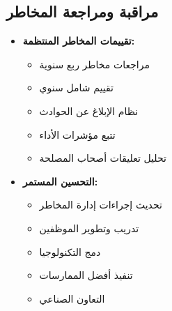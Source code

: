 \subsection{مراقبة ومراجعة المخاطر}
\begin{itemize}
    \item \textbf{تقييمات المخاطر المنتظمة:}
    \begin{itemize}
        \item مراجعات مخاطر ربع سنوية
        \item تقييم شامل سنوي
        \item نظام الإبلاغ عن الحوادث
        \item تتبع مؤشرات الأداء
        \item تحليل تعليقات أصحاب المصلحة
    \end{itemize}
    
    \item \textbf{التحسين المستمر:}
    \begin{itemize}
        \item تحديث إجراءات إدارة المخاطر
        \item تدريب وتطوير الموظفين
        \item دمج التكنولوجيا
        \item تنفيذ أفضل الممارسات
        \item التعاون الصناعي
    \end{itemize}
\end{itemize}
